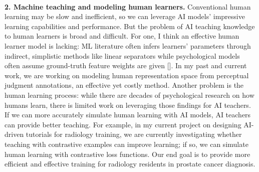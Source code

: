 \noindent \textbf{\\2. Machine teaching and modeling human learners.} Conventional human learning may be slow and inefficient, so we can leverage AI models' impressive learning capabilities and performance. But the problem of AI teaching knowledge to human learners is broad and difficult. For one, I think an effective human learner model is lacking: ML literature often infers learners' parameters through indirect, simplistic methods like linear separators while psychological models often assume ground-truth feature weights are given []. In my past and current work, we are working on modeling human representation space from perceptual judgment annotations, an effective yet costly method. Another problem is the human learning process: while there are decades of psychological research on how humans learn, there is limited work on leveraging those findings for AI teachers. If we can more accurately simulate human learning with AI models, AI teachers can provide better teaching. For example, in my current project on designing AI-driven tutorials for radiology training, we are currently investigating whether teaching with contrastive examples can improve learning; if so, we can simulate human learning with contrastive loss functions. Our end goal is to provide more efficient and effective training for radiology residents in prostate cancer diagnosis.

















